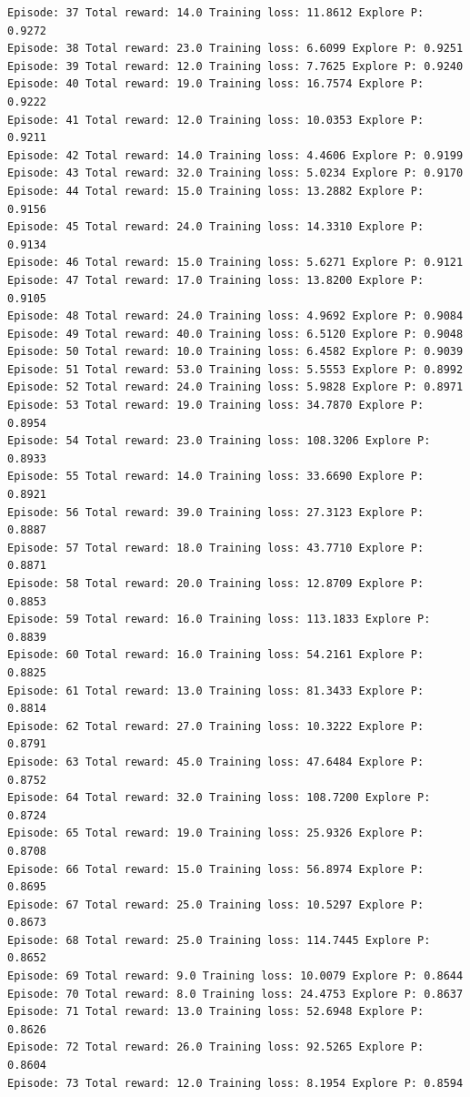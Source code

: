 \documentclass[11pt]{article}
\begin{document}
\begin{Verbatim}[commandchars=\\\{\}]
Episode: 37 Total reward: 14.0 Training loss: 11.8612 Explore P: 0.9272
Episode: 38 Total reward: 23.0 Training loss: 6.6099 Explore P: 0.9251
Episode: 39 Total reward: 12.0 Training loss: 7.7625 Explore P: 0.9240
Episode: 40 Total reward: 19.0 Training loss: 16.7574 Explore P: 0.9222
Episode: 41 Total reward: 12.0 Training loss: 10.0353 Explore P: 0.9211
Episode: 42 Total reward: 14.0 Training loss: 4.4606 Explore P: 0.9199
Episode: 43 Total reward: 32.0 Training loss: 5.0234 Explore P: 0.9170
Episode: 44 Total reward: 15.0 Training loss: 13.2882 Explore P: 0.9156
Episode: 45 Total reward: 24.0 Training loss: 14.3310 Explore P: 0.9134
Episode: 46 Total reward: 15.0 Training loss: 5.6271 Explore P: 0.9121
Episode: 47 Total reward: 17.0 Training loss: 13.8200 Explore P: 0.9105
Episode: 48 Total reward: 24.0 Training loss: 4.9692 Explore P: 0.9084
Episode: 49 Total reward: 40.0 Training loss: 6.5120 Explore P: 0.9048
Episode: 50 Total reward: 10.0 Training loss: 6.4582 Explore P: 0.9039
Episode: 51 Total reward: 53.0 Training loss: 5.5553 Explore P: 0.8992
Episode: 52 Total reward: 24.0 Training loss: 5.9828 Explore P: 0.8971
Episode: 53 Total reward: 19.0 Training loss: 34.7870 Explore P: 0.8954
Episode: 54 Total reward: 23.0 Training loss: 108.3206 Explore P: 0.8933
Episode: 55 Total reward: 14.0 Training loss: 33.6690 Explore P: 0.8921
Episode: 56 Total reward: 39.0 Training loss: 27.3123 Explore P: 0.8887
Episode: 57 Total reward: 18.0 Training loss: 43.7710 Explore P: 0.8871
Episode: 58 Total reward: 20.0 Training loss: 12.8709 Explore P: 0.8853
Episode: 59 Total reward: 16.0 Training loss: 113.1833 Explore P: 0.8839
Episode: 60 Total reward: 16.0 Training loss: 54.2161 Explore P: 0.8825
Episode: 61 Total reward: 13.0 Training loss: 81.3433 Explore P: 0.8814
Episode: 62 Total reward: 27.0 Training loss: 10.3222 Explore P: 0.8791
Episode: 63 Total reward: 45.0 Training loss: 47.6484 Explore P: 0.8752
Episode: 64 Total reward: 32.0 Training loss: 108.7200 Explore P: 0.8724
Episode: 65 Total reward: 19.0 Training loss: 25.9326 Explore P: 0.8708
Episode: 66 Total reward: 15.0 Training loss: 56.8974 Explore P: 0.8695
Episode: 67 Total reward: 25.0 Training loss: 10.5297 Explore P: 0.8673
Episode: 68 Total reward: 25.0 Training loss: 114.7445 Explore P: 0.8652
Episode: 69 Total reward: 9.0 Training loss: 10.0079 Explore P: 0.8644
Episode: 70 Total reward: 8.0 Training loss: 24.4753 Explore P: 0.8637
Episode: 71 Total reward: 13.0 Training loss: 52.6948 Explore P: 0.8626
Episode: 72 Total reward: 26.0 Training loss: 92.5265 Explore P: 0.8604
Episode: 73 Total reward: 12.0 Training loss: 8.1954 Explore P: 0.8594

\end{Verbatim}
\end{document}
